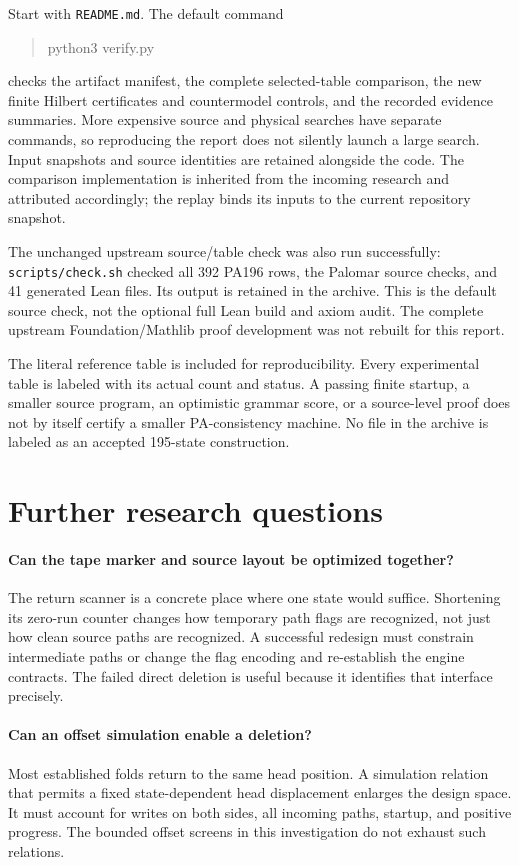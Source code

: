 \documentclass[11pt,letterpaper]{article}
\newcommand{\file}[1]{\texttt{\nolinkurl{#1}}}
\begin{document}
Start with \file{README.md}. The default command
\begin{quote}\ttfamily
python3 verify.py
\end{quote}
checks the artifact manifest, the complete selected-table comparison,
the new finite Hilbert certificates and countermodel controls, and the
recorded evidence summaries. More expensive source and physical searches
have separate commands, so reproducing the report does not silently
launch a large search. Input snapshots and source identities are retained
alongside the code. The comparison implementation is inherited from the
incoming research and attributed accordingly; the replay binds its
inputs to the current repository snapshot.

The unchanged upstream source/table check was also run successfully:
\file{scripts/check.sh} checked all 392 PA196 rows, the Palomar source
checks, and 41 generated Lean files. Its output is retained in the
archive. This is the default source check, not the optional full Lean
build and axiom audit. The complete upstream Foundation/Mathlib proof
development was not rebuilt for this report.

The literal reference table is included for reproducibility. Every
experimental table is labeled with its actual count and status. A
passing finite startup, a smaller source program, an optimistic grammar
score, or a source-level proof does not by itself certify a smaller
PA-consistency machine. No file in the archive is labeled as an accepted
195-state construction.

\section{Further research questions}

\paragraph{Can the tape marker and source layout be optimized together?}
The return scanner is a concrete place where one state would suffice.
Shortening its zero-run counter changes how temporary path flags are
recognized, not just how clean source paths are recognized. A successful
redesign must constrain intermediate paths or change the flag encoding
and re-establish the engine contracts. The failed direct deletion is
useful because it identifies that interface precisely.

\paragraph{Can an offset simulation enable a deletion?}
Most established folds return to the same head position. A simulation
relation that permits a fixed state-dependent head displacement enlarges
the design space. It must account for writes on both sides, all incoming
paths, startup, and positive progress. The bounded offset screens in
this investigation do not exhaust such relations.
\end{document}
